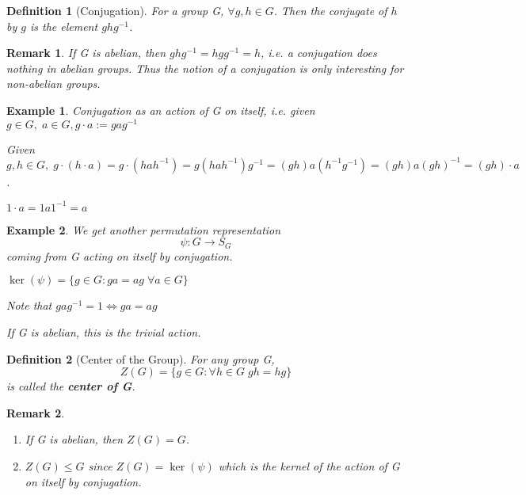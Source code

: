 \documentclass[11pt, oneside]{book}
\theoremstyle{break}
\newtheorem*{remark}{Remark}
\newtheorem{defn}{Definition}[section]
\newtheorem{eg}{Example}[section]
\begin{document}
\begin{defn}[Conjugation]
    For a group G, $\forall g, h \in G$. Then the conjugate of $h$ by $g$ is the element $ghg^{-1}$.
\end{defn}

\begin{remark}
    If G is abelian, then $ghg^{-1} = hgg^{-1} = h$, i.e. a conjugation does nothing in abelian groups. Thus the notion of a conjugation is only interesting for non-abelian groups.
\end{remark}

\begin{eg}
    Conjugation as an action of G on itself, i.e. given $g \in G, \; a \in G, g \cdot a := gag^{-1}$

    Given $g, h \in G, \; g \cdot (h \cdot a) = g \cdot (hah^{-1}) = g(hah^{-1})g^{-1} = (gh)a(h^{-1}g^{-1}) = (gh)a(gh)^{-1} = (gh) \cdot a$.

    $1 \cdot a = 1 a 1^{-1} = a$
\end{eg}

\begin{eg}
    We get another permutation representation
    \begin{equation}
        \psi: G \to S_G
    \end{equation}
    coming from G acting on itself by conjugation.

    $\ker(\psi) = \{g \in G : ga = ag \; \forall a \in G\}$

    Note that $gag^{-1} = 1 \iff ga = ag$

    If G is abelian, this is the trivial action.    
\end{eg}

\begin{defn}[Center of the Group]
    For any group G, 
    \begin{equation}
        Z(G) = \{g \in G : \forall h \in G \; gh = hg \}
    \end{equation}
    is called the \textbf{center of G}.
\end{defn}

\begin{remark}
    \begin{enumerate}
        \item If G is abelian, then $Z(G) = G$.
        \item $Z(G) \leq G$ since $Z(G) = \ker(\psi)$ which is the kernel of the action of G on itself by conjugation.
    \end{enumerate}
\end{remark}
\end{document}
